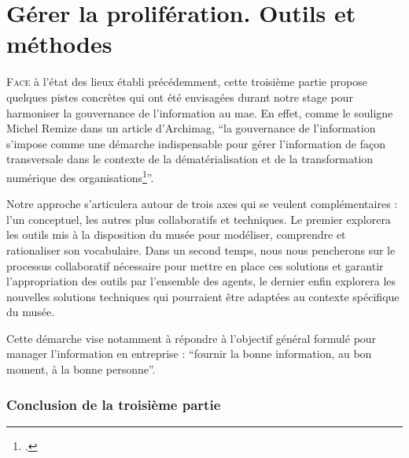 \documentclass[12pt,twoside]{book}
\newcommand{\mae}{\ac{mae}} %
\begin{document}
	
	\part{Gérer la prolifération. Outils et méthodes}
	
	
	
	\lettrine{F}{ace} à l'état des lieux établi précédemment, cette troisième partie propose quelques pistes concrètes qui ont été envisagées durant notre stage pour harmoniser la gouvernance de l'information au \mae. En effet, comme le souligne Michel Remize dans un article d'Archimag, \enquote{la gouvernance de l'information s'impose comme une démarche indispensable pour gérer l'information de façon transversale dans le contexte de la dématérialisation et de la transformation numérique des organisations\footcite{remizeGouvernanceLinformationPlongez2022}}.
	
	Notre approche s'articulera autour de trois axes qui se veulent complémentaires : l'un conceptuel, les autres plus collaboratifs et techniques. Le premier explorera les outils mis à la disposition du musée pour modéliser, comprendre et rationaliser son vocabulaire. Dans un second temps, nous nous pencherons sur le processus collaboratif nécessaire pour mettre en place ces solutions et garantir l'appropriation des outils par l'ensemble des agents, le dernier enfin explorera les nouvelles solutions techniques qui pourraient être adaptées au contexte spécifique du musée.
	
	Cette démarche vise notamment à répondre à l'objectif général formulé pour manager l'information en entreprise : \enquote{fournir la bonne information, au bon moment, à la bonne personne}.
	
	
	
	
	
	
	
	
	\section*{Conclusion de la troisième partie}
	
\end{document}
